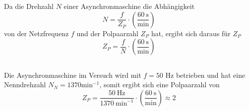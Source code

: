 \chapter{}\label{ex:aufg4}
%
\section{}\label{sec:aufg4a}
Da die Drehzahl $N$ einer Asynchronmaschine die Abhängigkeit
\begin{equation}
	N = \frac{f}{Z_P}\cdot \left(\frac{60~\text{s}}{\text{min}}\right)
	\label{eq:Drehzahl}
\end{equation}
von der Netzfrequenz $f$ und der Polpaarzahl $Z_P$  hat, ergibt sich daraus für $Z_P$
\begin{equation}
	Z_P = \frac{f}{N}\cdot \left(\frac{60~\text{s}}{\text{min}}\right)
\end{equation}
%

\section{}\label{sec:aufg4b}
Die Asynchronmaschine im Versuch wird mit $f = 50$ Hz betrieben und hat eine Nenndrehzahl $N_N = 1370 \mathrm{min}^{-1}$, somit ergibt sich eine Polpaarzahl von
\begin{equation}
	Z_P = \frac{50~\text{Hz}}{1370~\text{min}^{-1}} \cdot \left(\frac{60~\text{s}}{\text{min}}\right) \approx 2
\end{equation}